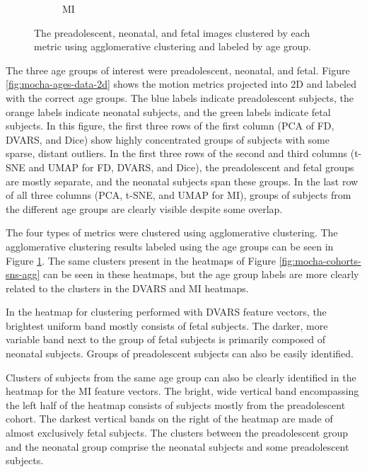 \begin{figure}
\begin{subfigure}{0.45\textwidth}
		\caption{MI}
	\end{subfigure}
\vspace{-10mm}
\caption{The preadolescent, neonatal, and fetal images clustered by each metric using agglomerative clustering and labeled by age group.}
\label{fig:mocha-ages-sns-agg}
\end{figure}

The three age groups of interest were preadolescent, neonatal, and fetal. Figure \ref{fig:mocha-ages-data-2d} shows the motion metrics projected into 2D and labeled with the correct age groups. The blue labels indicate preadolescent subjects, the orange labels indicate neonatal subjects, and the green labels indicate fetal subjects. In this figure, the first three rows of the first column (PCA of FD, DVARS, and Dice) show highly concentrated groups of subjects with some sparse, distant outliers. In the first three rows of the second and third columns (t-SNE and UMAP for FD, DVARS, and Dice), the preadolescent and fetal groups are mostly separate, and the neonatal subjects span these groups. In the last row of all three columns (PCA, t-SNE, and UMAP for MI), groups of subjects from the different age groups are clearly visible despite some overlap. 

The four types of metrics were clustered using agglomerative clustering. The agglomerative clustering results labeled using the age groups can be seen in Figure \ref{fig:mocha-ages-sns-agg}. The same clusters present in the heatmaps of Figure \ref{fig:mocha-cohorts-sns-agg} can be seen in these heatmaps, but the age group labels are more clearly related to the clusters in the DVARS and MI heatmaps.

In the heatmap for clustering performed with DVARS feature vectors, the brightest uniform band mostly consists of fetal subjects. The darker, more variable band next to the group of fetal subjects is primarily composed of neonatal subjects. Groups of preadolescent subjects can also be easily identified. 

Clusters of subjects from the same age group can also be clearly identified in the heatmap for the MI feature vectors. The bright, wide vertical band encompassing the left half of the heatmap consists of subjects mostly from the preadolescent cohort. The darkest vertical bands on the right of the heatmap are made of almost exclusively fetal subjects. The clusters between the preadolescent group and the neonatal group comprise the neonatal subjects and some preadolescent subjects. 

